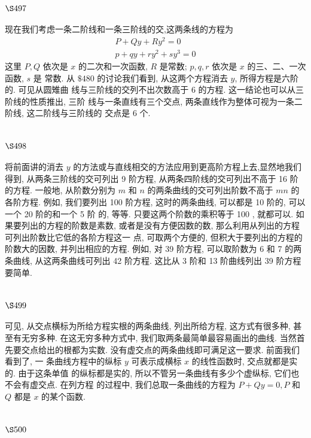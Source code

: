 \section{$\S 497$}

现在我们考虑一条二阶线和一条三阶线的交,这两条线的方程为
\[
\begin{gathered}
P+Q y+R y^{2}=0 \\
p+q y+r y^{2}+s y^{3}=0
\end{gathered}
\]
这里 $P, Q$ 依次是 $x$ 的二次和一次函数, $R$ 是常数; $p, q, r$ 依次是 $x$ 的三、二、一次函数, $s$ 是 常数. 从 $\$ 480$ 的讨论我们看到, 从这两个方程消去 $y$, 所得方程是六阶的. 可见从圆雉曲 线与三阶线的交列不出次数高于 6 的方程. 这一结论也可以从三阶线的性质推出, 三阶 线与一条直线有三个交点, 两条直线作为整体可视为一条二阶线, 这二阶线与三阶线的 交点是 6 个.

\section{$\S 498$}

将前面讲的消去 $y$ 的方法或与直线相交的方法应用到更高阶方程上去,显然地我们 得到, 从两条三阶线的交可列出 9 阶方程, 从两条四阶线的交可列出不高于 16 阶的方程. 一般地, 从阶数分别为 $m$ 和 $n$ 的两条曲线的交可列出阶数不高于 $m n$ 的各阶方程. 例如, 我们要列出 100 阶方程, 这时的两条曲线, 可以都是 10 阶的, 可以一个 20 阶的和一个 5 阶 的, 等等. 只要这两个阶数的乘积等于 100 , 就都可以. 如果要列出的方程的阶数是素数, 或者是没有方便因数的数, 那么利用从列出的方程可列出阶数比它低的各阶方程这一 点, 可取两个方便的, 但积大于要列出的方程的阶数大的因数, 并列出相应的方程. 例如, 对 39 阶方程, 可以取阶数为 6 和 7 的两条曲线, 从这两条曲线可列出 42 阶方程. 这比从 3 阶和 13 阶曲线列出 39 阶方程要简单.

\section{$\S 499$}

可见, 从交点横标为所给方程实根的两条曲线, 列出所给方程, 这方式有很多种, 甚 至有无穷多种. 在这无穷多种方式中, 我们取两条最简单最容易画出的曲线. 当然首先要交点给出的根都为实数. 没有虚交点的两条曲线即可满足这一要求. 前面我们看到了, 一 条曲线方程中的纵标 $y$ 可表示成横标 $x$ 的线性函数时, 交点就都是实的. 由于这条单值 的纵标都是实的, 所以不管另一条曲线有多少个虚纵标, 它们也不会有虚交点. 在列方程 的过程中, 我们总取一条曲线的方程为 $P+Q y=0, P$ 和 $Q$ 都是 $x$ 的某个函数.

\section{$\S 500$}


